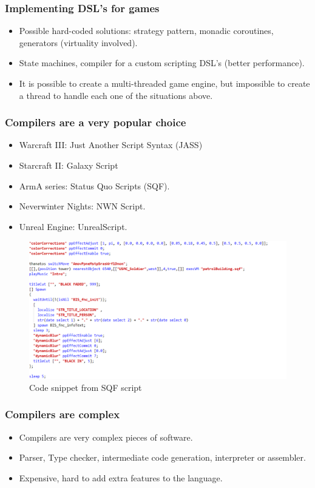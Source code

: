 \documentclass[10pt,a4paper]{beamer}
\begin{document}
\begin{frame}
	\frametitle{Implementing DSL's for games}
	\begin{itemize}
		\item Possible hard-coded solutions: strategy pattern, monadic coroutines, generators (virtuality involved).
		\item State machines, compiler for a custom scripting DSL's (better performance).
		\item It is possible to create a multi-threaded game engine, but impossible to create a thread to handle each one of the situations above.
	\end{itemize}
\end{frame}

\begin{frame}
	\frametitle{Compilers are a very popular choice}
	\begin{itemize}
		\item Warcraft III: Just Another Script Syntax (JASS)
		\item Starcraft II: Galaxy Script
		\item ArmA series: Status Quo Scripts (SQF).
		\item Neverwinter Nights: NWN Script.
		\item Unreal Engine: UnrealScript.
	\end{itemize}
	
	\begin{figure}
		\includegraphics[scale = 0.25]{Pictures/sqf}
		\caption{Code snippet from SQF script}
	\end{figure}
\end{frame}

\begin{frame}
	\frametitle{Compilers are complex}
	\begin{itemize}
		\item Compilers are very complex pieces of software.
		\item Parser, Type checker, intermediate code generation, interpreter or assembler.
		\item Expensive, hard to add extra features to the language.
	\end{itemize}
\end{frame}
\end{document}
